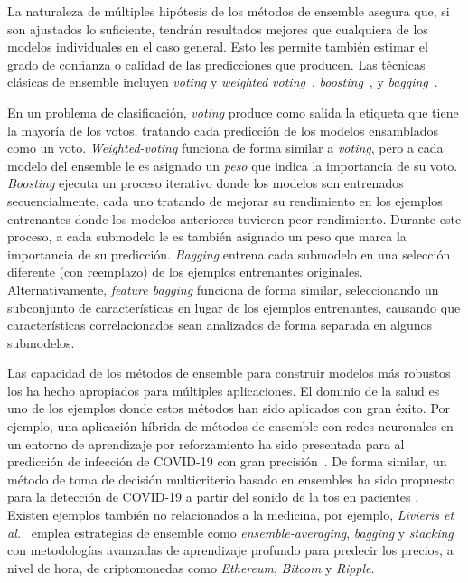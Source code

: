 La naturaleza de múltiples hipótesis de los métodos de ensemble asegura que, si son ajustados lo suficiente, tendrán resultados mejores que cualquiera de los modelos individuales en el caso general. Esto les permite también estimar el grado de confianza o calidad de las predicciones que producen. Las técnicas clásicas de ensemble incluyen \emph{voting} y \textit{weighted voting}~\parencite{dietterich2000ensemble}, \emph{boosting}~\parencite{schapire1990strength}, y \emph{bagging}~\parencite{breiman1996bagging}.

En un problema de clasificación, \emph{voting} produce como salida la etiqueta que tiene la mayoría de los votos, tratando cada predicción de los modelos ensamblados como un voto.
\emph{Weighted-voting} funciona de forma similar a \emph{voting}, pero a cada modelo del ensemble le es asignado un \emph{peso} que indica la importancia de su voto.
\emph{Boosting} ejecuta un proceso iterativo donde los modelos son entrenados secuencialmente, cada uno tratando de mejorar su rendimiento en los ejemplos entrenantes donde los modelos anteriores tuvieron peor rendimiento.
Durante este proceso, a cada submodelo le es también asignado un peso que marca la importancia de su predicción.
\textit{Bagging} entrena cada submodelo en una selección diferente (con reemplazo) de los ejemplos entrenantes originales.
Alternativamente, \textit{feature bagging} funciona de forma similar, seleccionando un subconjunto de características en lugar de los ejemplos entrenantes, causando que características correlacionados sean analizados de forma separada en algunos submodelos.

Las capacidad de los métodos de ensemble para construir modelos más robustos los ha hecho apropiados para múltiples aplicaciones.
El dominio de la salud es uno de los ejemplos donde estos métodos han sido aplicados con gran éxito.
Por ejemplo, una aplicación híbrida de métodos de ensemble con redes neuronales en un entorno de aprendizaje por reforzamiento ha sido presentada para al predicción de infección de COVID-19 con gran precisión~\parencite{JIN2022105560}.
De forma similar, un método de toma de decisión multicriterio basado en ensembles ha sido propuesto para la detección de COVID-19 a partir del sonido de la tos en pacientes \parencite{CHOWDHURY2022105405}.
Existen ejemplos también no relacionados a la medicina, por ejemplo, \emph{Livieris et al.}~\parencite{livieris2020ensemble} emplea estrategias de ensemble como \textit{ensemble-averaging}, \textit{bagging} y \textit{stacking} con metodologías avanzadas de aprendizaje profundo para predecir los precios, a nivel de hora, de criptomonedas como \textit{Ethereum}, \textit{Bitcoin} y \textit{Ripple}.

